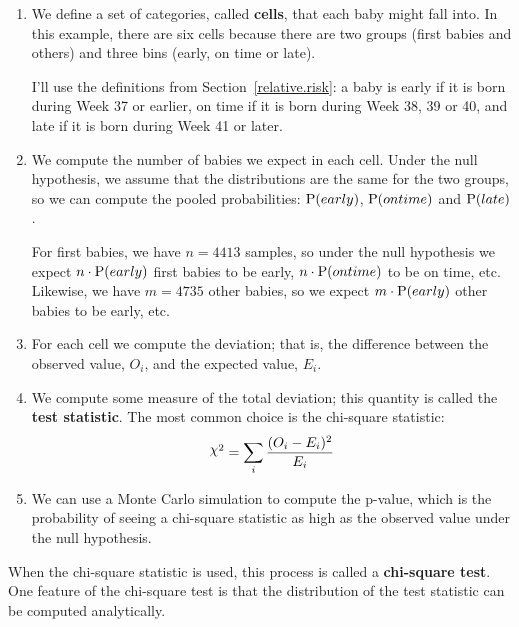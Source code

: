 \documentclass[12pt]{book}
\begin{document}
\begin{enumerate}

\item We define a set of categories, called {\bf cells}, that each
  baby might fall into.  In this example, there are six cells because
  there are two groups (first babies and others) and three bins
  (early, on time or late).

I'll use the definitions from Section~\ref{relative.risk}: a baby is
early if it is born during Week 37 or earlier, on time if it is born
during Week 38, 39 or 40, and late if it is born during Week 41 or
later.

\item We compute the number of babies we expect in each cell.  Under
  the null hypothesis, we assume that the distributions are the same
  for the two groups, so we can compute the pooled probabilities:
  $\mathrm{P}(early)$, $\mathrm{P}(ontime)$ and $\mathrm{P}(late)$.

For first babies, we have $n = 4413$ samples, so under the null
hypothesis we expect $n \cdot \mathrm{P}(early)$ first babies to be early,
$n \cdot \mathrm{P}(ontime)$ to be on time, etc.  Likewise, we have $m = 4735$
other babies, so we expect $m \cdot \mathrm{P}(early)$ other babies to be
early, etc.

\item For each cell we compute the deviation; that is, the difference
  between the observed value, $O_i$, and the expected value, $E_i$.

\item We compute some measure of the total deviation; this quantity
is called the {\bf test statistic}.  The most common
choice is the chi-square statistic:
%
\[ \goodchi^2 = \sum_i \frac{(O_i - E_i)^2}{E_i} \]
%

\item We can use a Monte Carlo simulation to compute the p-value,
  which is the probability of seeing a chi-square statistic as high
  as the observed value under the null hypothesis.

\end{enumerate}

When the chi-square statistic is used, this process is called a 
{\bf chi-square test}.  One feature of the chi-square test is that
the distribution of the test statistic can be computed analytically.
\end{document}
